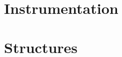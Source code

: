 \documentclass{article}
\begin{document}
\section{Instrumentation}
\label{instrumentation}


\section{Structures}
\label{structures}





\end{document}
